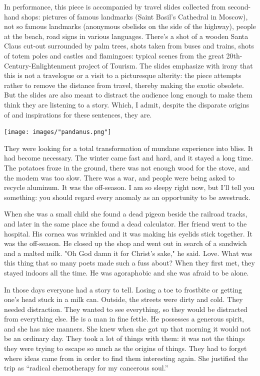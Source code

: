 \documentclass[
]{memoir}
\begin{document}
In performance, this piece is accompanied by travel slides collected
from second-hand shops: pictures of famous landmarks (Saint Basil's
Cathedral in Moscow), not so famous landmarks (anonymous obelisks on the
side of the highway), people at the beach, road signs in various
languages. There's a shot of a wooden Santa Claus cut-out surrounded by
palm trees, shots taken from buses and trains, shots of totem poles and
castles and flamingoes: typical scenes from the great
20th-Century-Enlightenment project of Tourism. The slides emphasize with
irony that this is not a travelogue or a visit to a picturesque
alterity: the piece attempts rather to remove the distance from travel,
thereby making the exotic obsolete. But the slides are also meant to
distract the audience long enough to make them think they are listening
to a story. Which, I admit, despite the disparate origins of and
inspirations for these sentences, they are.

\begin{center}\texttt{[image: images/"pandanus.png"]}\end{center}

They were looking for a total transformation of mundane experience into
bliss. It had become necessary. The winter came fast and hard, and it
stayed a long time. The potatoes froze in the ground, there was not
enough wood for the stove, and the modem was too slow. There was a war,
and people were being asked to recycle aluminum. It was the off-season.
I am so sleepy right now, but I'll tell you something: you should regard
every anomaly as an opportunity to be awestruck.

When she was a small child she found a dead pigeon beside the railroad
tracks, and later in the same place she found a dead calculator. Her
friend went to the hospital. His cornea was wrinkled and it was making
his eyelids stick together. It was the off-season. He closed up the shop
and went out in search of a sandwich and a malted milk. "Oh God damn it
for Christ's sake," he said. Love. What was this thing that so many
poets made such a fuss about? When they first met, they stayed indoors
all the time. He was agoraphobic and she was afraid to be alone.

In those days everyone had a story to tell. Losing a toe to frostbite or
getting one's head stuck in a milk can. Outside, the streets were dirty
and cold. They needed distraction. They wanted to see everything, so
they would be distracted from everything else. He is a man in fine
fettle. He possesses a generous spirit, and she has nice manners. She
knew when she got up that morning it would not be an ordinary day. They
took a lot of things with them: it was not the things they were trying
to escape so much as the origins of things. They had to forget where
ideas came from in order to find them interesting again. She justified
the trip as ``radical chemotherapy for my cancerous soul.''
\end{document}
